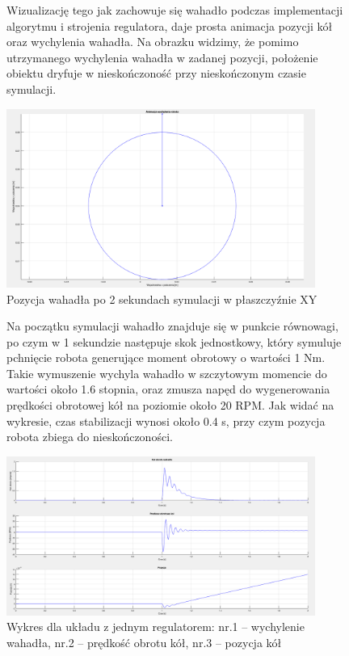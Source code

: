 \begin{figure}
    Wizualizację tego jak zachowuje się wahadło podczas implementacji algorytmu i strojenia regulatora, daje prosta animacja pozycji kół oraz wychylenia wahadła. Na obrazku widzimy, że pomimo utrzymanego wychylenia wahadła w zadanej pozycji, położenie obiektu dryfuje w nieskończoność przy nieskończonym czasie symulacji.
    \\ 
    \begin{center}
        \includegraphics[width=0.9\textwidth]{Rysunki/Rozdzial02/Pojedynczy_PID_animacja.png}
	    \caption{Pozycja wahadła po 2 sekundach symulacji w płaszczyźnie XY}
    \end{center}
	\label{PID animacja}
\end{figure}

\begin{figure}
    Na początku symulacji wahadło znajduje się w punkcie równowagi, po czym w 1 sekundzie następuje skok jednostkowy, który symuluje pchnięcie robota generujące moment obrotowy o wartości 1 Nm. Takie wymuszenie wychyla wahadło w szczytowym momencie do wartości około 1.6 stopnia, oraz zmusza napęd do wygenerowania prędkości obrotowej kół na poziomie około 20 RPM. Jak widać na wykresie, czas stabilizacji wynosi około 0.4 s, przy czym pozycja robota zbiega do nieskończoności.
    \\
    \begin{center}
        \includegraphics[width=0.9\textwidth]{Rysunki/Rozdzial02/Pojedynczy_PID_wykresy.png}
	    \caption{Wykres dla układu z jednym regulatorem: nr.1 -- wychylenie wahadła, nr.2 -- prędkość obrotu kół, nr.3 -- pozycja kół}
    \end{center}
	\label{Wykresy PID1}
\end{figure}

